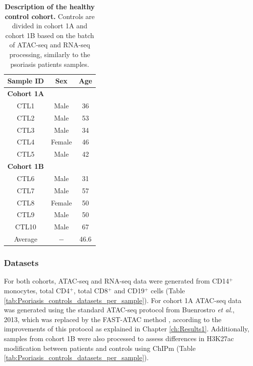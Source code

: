 \begin{table}[htbp]
\centering
\begin{tabular}{@{} c c c}
\toprule
\textbf{Sample ID} & \textbf{Sex} & \textbf{Age} \\
\midrule
\midrule
\textbf{Cohort 1A} & & \\
\midrule
CTL1 & Male   & 36 \\
CTL2 & Male   & 53 \\
CTL3 & Male   & 34 \\
CTL4 & Female & 46 \\
CTL5 & Male   & 42 \\
\midrule
\midrule
\textbf{Cohort 1B} & & \\
\midrule
CTL6  & Male   & 31 \\
CTL7  & Male   & 57 \\
CTL8  & Female & 50 \\
CTL9  & Male   & 50 \\
CTL10 & Male   & 67 \\
\midrule
Average & $-$ & 46.6 \\ 
\bottomrule
\end{tabular}
\medskip %
\caption[Description of the healthy control cohort.]{\textbf{Description of the healthy control cohort.} Controls are divided in cohort 1A and cohort 1B based on the batch of ATAC-seq and RNA-seq processing, similarly to the psoriasis patients samples.}
\label{tab:Control_cohort_metadata}
\end{table}
\bigskip %


\subsubsection{Datasets}

For both cohorts, ATAC-seq and RNA-seq data were generated from CD14$^+$ monocytes, total CD4$^+$, total CD8$^+$ and CD19$^+$ cells (Table \ref{tab:Psoriasis_controls_datasets_per_sample}). For cohort 1A ATAC-seq data was generated using the standard ATAC-seq protocol from Buenrostro \textit{et al.}, 2013, which was replaced by the FAST-ATAC method \parencite{Corces2016}, according to the improvements of this protocol as explained in Chapter \ref{ch:Results1}. Additionally, samples from cohort 1B were also processed to assess differences in H3K27ac modification between patients and controls using ChIPm (Table \ref{tab:Psoriasis_controls_datasets_per_sample}). 

